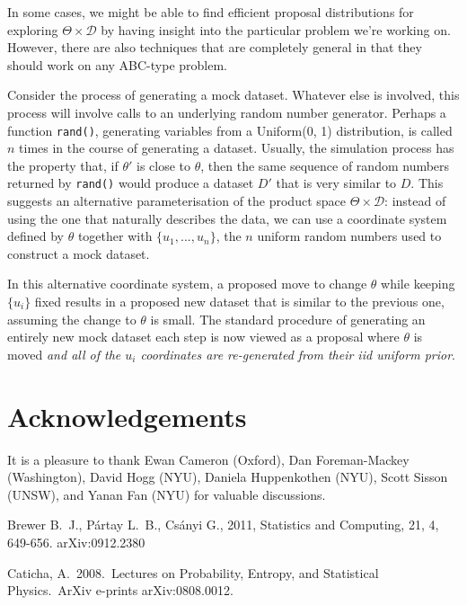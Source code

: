 \documentclass[article]{jss}
\newcommand{\params}{\theta}
\newcommand{\data}{D}
\begin{document}
In some cases, we might be able to find efficient proposal distributions for exploring $\Theta \times \mathcal{D}$ by having insight into the particular
problem we're working on. However, there are also techniques that are
completely general in that they should work on any ABC-type problem.

Consider the process of generating a mock dataset. Whatever else is involved,
this process will involve calls to an underlying random number generator.
Perhaps a function {\tt rand()}, generating variables from a Uniform(0, 1)
distribution, is called $n$ times in the course of generating a dataset.
Usually, the simulation process has the property that, if $\theta'$ is
close to $\theta$, then the same sequence of random numbers returned by
{\tt rand()} would produce a dataset $\data'$ that is very similar to $\data$.
This suggests an alternative parameterisation of
the product space $\Theta\times\mathcal{D}$: instead of using the one that
naturally describes the data, we can use a coordinate system defined by
$\theta$ together with $\{u_1, ..., u_n\}$, the $n$ uniform random numbers
used to construct a mock dataset.

In this alternative coordinate system, a proposed move
to change $\params$ while keeping
$\{u_i\}$ fixed results in a proposed new dataset that is similar to the
previous one, assuming the change to $\params$ is small. The standard procedure
of generating an entirely new mock dataset each step is now viewed as a
proposal where $\params$ is moved {\it and all of the $u_i$ coordinates are
re-generated from their iid uniform prior}.

\section*{Acknowledgements}
It is a pleasure to thank Ewan Cameron (Oxford), Dan
Foreman-Mackey (Washington), David Hogg (NYU), Daniela Huppenkothen (NYU),
Scott Sisson (UNSW), and Yanan Fan (NYU) for valuable discussions.

\begin{thebibliography}{99}
 Brewer B.~J., P{\'a}rtay L.~B., Cs{\'a}nyi G., 2011,
Statistics and Computing, 21, 4, 649-656. arXiv:0912.2380

 Caticha, A.\ 2008.\ Lectures 
on Probability, Entropy, and Statistical Physics.\ ArXiv e-prints 
arXiv:0808.0012.

\end{thebibliography}
\end{document}
